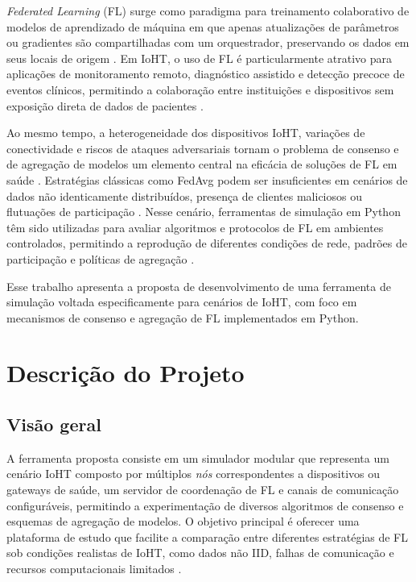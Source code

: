 \documentclass[12pt]{article}
\begin{document}
\textit{Federated Learning} (FL) surge como paradigma para treinamento colaborativo de modelos de aprendizado de máquina em que apenas atualizações de parâmetros ou gradientes são compartilhadas com um orquestrador, preservando os dados em seus locais de origem \cite{Zhang2024_FLIoTSurvey}. Em IoHT, o uso de FL é particularmente atrativo para aplicações de monitoramento remoto, diagnóstico assistido e detecção precoce de eventos clínicos, permitindo a colaboração entre instituições e dispositivos sem exposição direta de dados de pacientes \cite{Nevrataki2023_SurveyFLApplications,Kalaiselvi2023_HealthcareMetaverseSurvey}.

Ao mesmo tempo, a heterogeneidade dos dispositivos IoHT, variações de conectividade e riscos de ataques adversariais tornam o problema de consenso e de agregação de modelos um elemento central na eficácia de soluções de FL em saúde \cite{Kumar2020_SecureIoHT,Nevrataki2023_SurveyFLApplications}. Estratégias clássicas como FedAvg podem ser insuficientes em cenários de dados não identicamente distribuídos, presença de clientes maliciosos ou flutuações de participação \cite{Nevrataki2023_SurveyFLApplications,Zhang2024_FLIoTSurvey}. Nesse cenário, ferramentas de simulação em Python têm sido utilizadas para avaliar algoritmos e protocolos de FL em ambientes controlados, permitindo a reprodução de diferentes condições de rede, padrões de participação e políticas de agregação \cite{Intel2020_OpenFLTutorial}.

Esse trabalho apresenta a proposta de desenvolvimento de uma ferramenta de simulação voltada especificamente para cenários de IoHT, com foco em mecanismos de consenso e agregação de FL implementados em Python.

\section{Descrição do Projeto}

\subsection{Visão geral}

A ferramenta proposta consiste em um simulador modular que representa um cenário IoHT composto por múltiplos \textit{nós} correspondentes a dispositivos ou gateways de saúde, um servidor de coordenação de FL e canais de comunicação configuráveis, permitindo a experimentação de diversos algoritmos de consenso e esquemas de agregação de modelos. O objetivo principal é oferecer uma plataforma de estudo que facilite a comparação entre diferentes estratégias de FL sob condições realistas de IoHT, como dados não IID, falhas de comunicação e recursos computacionais limitados \cite{Zhang2024_FLIoTSurvey,Kalaiselvi2023_HealthcareMetaverseSurvey}.
\end{document}
